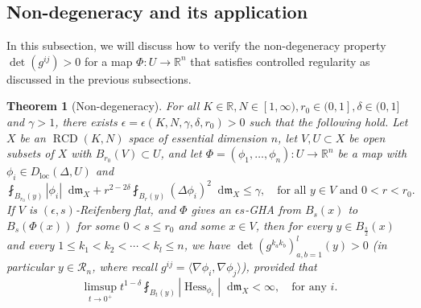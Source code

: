 \documentclass[11pt,reqno]{amsart}
\newtheorem{theorem}{Theorem}[section]
\theoremstyle{definition}
\numberwithin{equation}{section}
\newcommand{\di}{\mathop{}\!\mathrm{d}}
\newcommand{\meas}{\mathfrak{m}}
\DeclareMathOperator{\Hess}{Hess}
\DeclareMathOperator{\loc}{loc}
\DeclareMathOperator{\RCD}{RCD}
\begin{document}
\subsection{Non-degeneracy and its application}\label{subsecnong}

In this subsection, we will discuss how to verify the non-degeneracy property 
$
    \det (g^{ij}) > 0
$
for a map $\Phi:U \to \mathbb{R}^n$ that satisfies controlled regularity as discussed in the previous subsections.  
 

 \begin{theorem}[Non-degeneracy]\label{nondeg}
 For all $K \in \mathbb{R}, N \in [1, \infty), r_0 \in (0,1], \delta \in (0,1]$ and $\gamma >1$, there exists $\epsilon = \epsilon (K, N, \gamma, \delta, r_0) > 0$ such that the following hold.
Let $X$ be an $\RCD(K, N)$ space of essential dimension $n$, let $V,U \subset X$ be open subsets of $X$ with $B_{r_0}(V)\subset U$,
and let $\Phi=(\phi_1, \ldots, \phi_n):U \to \mathbb{R}^n$ be a map 
with $\phi_i \in D_{\loc}(\Delta, U)$ and 
 \begin{equation}
        \fint_{B_{r_0}(y)}|\phi_i|\di \meas_X+r^{2-2\delta}\fint_{B_r(y)}(\Delta \phi_i)^2\di \meas_X \le \gamma,\quad \text{for all $y \in V$ and $0<r<r_0$.}
    \end{equation}
If
   $V$ is $(\epsilon, s)$-Reifenberg flat,
    and 
    $\Phi$ gives an $\epsilon s$-GHA from $B_s(x)$ to $B_s(\Phi(x))$ 
    for some $0<s \le r_0$ and some $x \in V$,
then for every $y \in B_{\frac{s}{2}}(x)$ and every $1\le k_1<k_2<\cdots<k_l \le n$, we have
$
\det(g^{k_a k_b})_{a,b=1}^{l}(y)>0$ 
(in particular $y \in \mathcal{R}_n$, where recall $g^{ij}=\langle \nabla \phi_i, \nabla \phi_j\rangle$),
provided that
\begin{equation}\label{deltacond}
\limsup_{t \to 0^+}t^{1- \delta}\fint_{B_t(y)}|\Hess_{\phi_i}|\di \meas_X <\infty, \quad \text{for any $i$.}
\end{equation}
\end{theorem}
\end{document}
